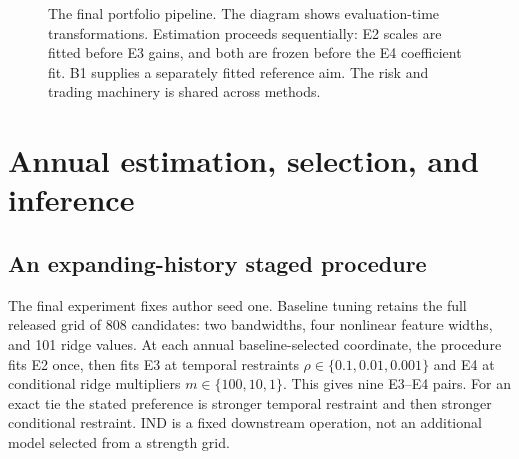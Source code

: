 \documentclass[12pt,letterpaper,fleqn]{article}
\begin{document}
\begin{figure}[!htbp]
\centering
{}
\caption{The final portfolio pipeline. The diagram shows evaluation-time transformations. Estimation proceeds sequentially: E2 scales are fitted before E3 gains, and both are frozen before the E4 coefficient fit. B1 supplies a separately fitted reference aim. The risk and trading machinery is shared across methods.}\label{fig:pipeline}
\end{figure}

\FloatBarrier
\section{Annual estimation, selection, and inference}\label{sec:design}
\subsection{An expanding-history staged procedure}
The final experiment fixes author seed one. Baseline tuning retains the full released grid of 808 candidates: two bandwidths, four nonlinear feature widths, and 101 ridge values. At each annual baseline-selected coordinate, the procedure fits E2 once, then fits E3 at temporal restraints $\rho\in\{0.1,0.01,0.001\}$ and E4 at conditional ridge multipliers $m\in\{100,10,1\}$. This gives nine E3--E4 pairs. For an exact tie the stated preference is stronger temporal restraint and then stronger conditional restraint. IND is a fixed downstream operation, not an additional model selected from a strength grid.
\end{document}
